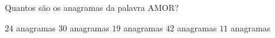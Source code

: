 Quantos são os anagramas da palavra AMOR?

$24$ anagramas
$30$ anagramas
$19$ anagramas
$42$ anagramas
$11$ anagramas



